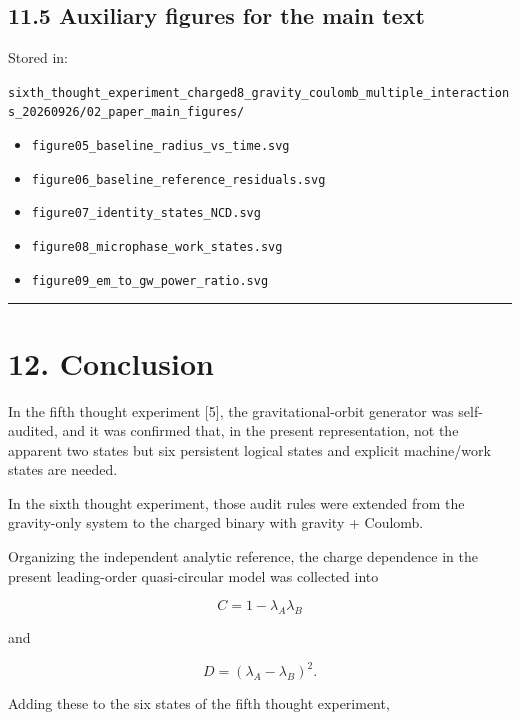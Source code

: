 \documentclass[
  a4paper,
]{article}
\providecommand{\tightlist}{%
  \setlength{\itemsep}{0pt}\setlength{\parskip}{0pt}}
\begin{document}
\subsection{11.5 Auxiliary figures for the main
text}\label{auxiliary-figures-for-the-main-text}

Stored in:

\texttt{sixth\_\allowbreak{}thought\_\allowbreak{}experiment\_\allowbreak{}charged8\_\allowbreak{}gravity\_\allowbreak{}coulomb\_\allowbreak{}multiple\_\allowbreak{}interactions\_\allowbreak{}20260926/\allowbreak{}02\_\allowbreak{}paper\_\allowbreak{}main\_\allowbreak{}figures/\allowbreak{}}

\begin{itemize}
\tightlist
\item
  \texttt{figure05\_baseline\_radius\_vs\_time.svg}
\item
  \texttt{figure06\_baseline\_reference\_residuals.svg}
\item
  \texttt{figure07\_identity\_states\_NCD.svg}
\item
  \texttt{figure08\_microphase\_work\_states.svg}
\item
  \texttt{figure09\_em\_to\_gw\_power\_ratio.svg}
\end{itemize}

\begin{center}\rule{0.5\linewidth}{0.5pt}\end{center}

\section{12. Conclusion}\label{conclusion}

In the fifth thought experiment {[}5{]}, the gravitational-orbit
generator was self-audited, and it was confirmed that, in the present
representation, not the apparent two states but six persistent logical
states and explicit machine/work states are needed.

In the sixth thought experiment, those audit rules were extended from
the gravity-only system to the charged binary with gravity + Coulomb.

Organizing the independent analytic reference, the charge dependence in
the present leading-order quasi-circular model was collected into

\[
C=1-\lambda_A\lambda_B
\]

and

\[
D=(\lambda_A-\lambda_B)^2.
\]

Adding these to the six states of the fifth thought experiment,
\end{document}
